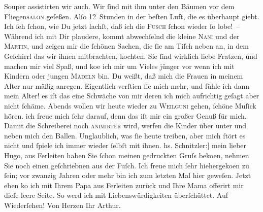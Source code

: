 \begin{ledgroupsized}[t]{13cm}
{                  Souper assistirten} wir auch. Wir ſind mit ihm unter den Bäumen vor dem
                  Fliegen\textsc{salon} geſeßen. Alſo 12 Stunden in der beſten
               Luft, die es überhaupt giebt. Ich ſeh ſchon, wie Du jetzt lachſt, daß ich die \textsc{Fusch} ſchon wieder ſo lobe! –\pend
           \pstart
           Während ich mit Dir plaudere, kommt abwechſelnd die kleine \textsc{Nani} und der \textsc{Martin}, und zeigen mir die ſchönen Sachen, die ſie am Tiſch neben an, in dem Geſchirrl
               das {\pb}wir ihnen mitbrachten, kochten. Sie ſind wirklich
               liebe Fratzen, und machen mir viel Spaß, und ko{\geminationm}e ich
               mir um Vieles jünger vor wenn ich mit Kindern oder jungen \textsc{Mädeln} bin. Du weißt, daß mich die Frauen in meinem Alter nur mäßig anregen.
               Eigentlich verſti{\geminationm}en ſie mich mehr, und fühle ich dann
               mein Alter! es iſt das eine Schwäche von mir deren ich mich aufrichtig geſagt aber
               nicht ſchäme.\pend
           \pstart
           Abends wollen wir heute wieder zu \textsc{Weilguni} gehen, ſchöne Muſick hören. ich freue mich ſehr darauf, denn das iſt mir ein
               großer Genuß für mich.\pend
           \pstart
           Damit die Schreiberei noch \textsc{animirter} wird, werfen die
               Kinder über unter und neben mich den Ballen. Unglaublich, was ſie heute treiben, aber
               mich ſtört es nicht und ſpiele ich immer wieder ſelbſt mit ihnen. \pend
           {\bigskip}\pstart
           \noindent{}{\pb}{[}hs. Schnitzler:{]} mein lieber Hugo, aus Ferleiten haben Sie ſchon meinen gedruckten Gruſs beko{\geminationm}en, nehmen Sie noch einen geſchriebnen aus der Fuſch. Ich freue mich ſehr hiehergeko{\geminationm}en zu ſein; vor zwanzig Jahren oder mehr bin ich zum
               letzten Mal hier geweſen. Jetzt eben ko{\geminationm} ich mit Ihrem
                  Papa aus Ferleiten zurück und Ihre Mama offerirt mir dieſe leere
               Seite. So werd ich mit Liebenswürdigkeiten überſchüttet.\pend
           \pstart
           Auf Wiederſehen!\pend
           \pstart Von Herzen Ihr \spacefill\mbox{Arthur.}\pend{}
         
         \endnumbering{}\end{ledgroupsized}  \newcommand{\dateiname}{L00824}\newcommand{\titel}{Anna von Hofmannsthal und Arthur Schnitzler an Hugo von Hofmannsthal, [19. 7. 1898]}\newcommand{\editorInnen}{Martin Anton Müller und Gerd-Hermann Susen}
      